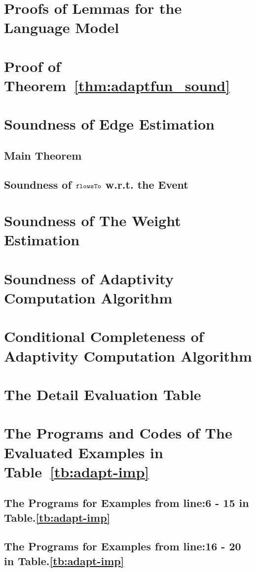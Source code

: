 \section{Proofs of Lemmas for the Language Model}
\label{apdx:lemma_sec123}

\section{Proof of Theorem~\ref{thm:adaptfun_sound}}
\label{apdx:adapt_soundness}

\clearpage
\section{Soundness of Edge Estimation}
\label{apdx:flowsto_soundness}
\subsection{Main Theorem}

%
\subsection{Soundness of $\mathtt{flowsTo}$ w.r.t. the Event}
\label{apdx:flowsto_event_soundness}

\clearpage
\section{Soundness of The Weight Estimation}
\label{apdx:reachability_soundness}

\clearpage
\section{Soundness of Adaptivity Computation Algorithm}
\label{apdx:adaptalg_soundness}

\section{Conditional Completeness of Adaptivity Computation Algorithm}
\label{apdx:adaptalg_completeness}


\section{The Detail Evaluation Table}
\label{apdx:eval_table}

\section{The Programs and Codes of The Evaluated Examples in Table~\ref{tb:adapt-imp}}
\label{apdx:evaluated_examples}
\subsection{The Programs for Examples from line:6 - 15 in Table.\ref{tb:adapt-imp}}


\subsection{The Programs for Examples from line:16 - 20 in Table.\ref{tb:adapt-imp}}

